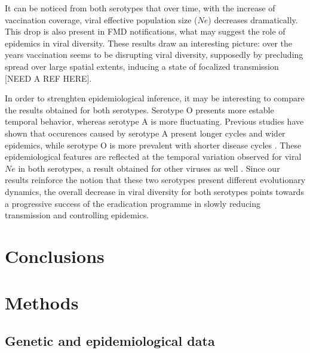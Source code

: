 \documentclass[10pt]{article}
\begin{document}
It can be noticed from both serotypes that over time, with the increase of vaccination coverage, viral effective population size ($Ne$) decreases dramatically.
This drop is also present in FMD notifications, what may suggest the role of epidemics in viral diversity.
These results draw an interesting picture: over the years vaccination seems to be disrupting viral diversity, supposedly by precluding spread over large spatial extents, inducing a state of focalized transmission [NEED A REF HERE].

In order to strenghten epidemiological inference, it may be interesting to compare the results obtained for both serotypes.
Serotype O presents more estable temporal behavior, whereas serotype A is more fluctuating.
Previous studies have shown that occurences caused by serotype A present longer cycles and wider epidemics, while serotype O is more prevalent with shorter disease cycles \cite{colombiatime}.
These epidemiological features are reflected at the temporal variation observed for viral $Ne$ in both serotypes, a result obtained for other viruses as well \cite{Bennett2010,Pybus2003}. 
Since our results reinforce the notion that these two serotypes present different evolutionary dynamics, the overall decrease in viral diversity for both serotypes points towards a progressive success of the eradication programme in slowly reducing transmission and controlling epidemics.
\section*{Conclusions}
\section*{Methods}

\subsection*{Genetic and epidemiological data}
\end{document}
